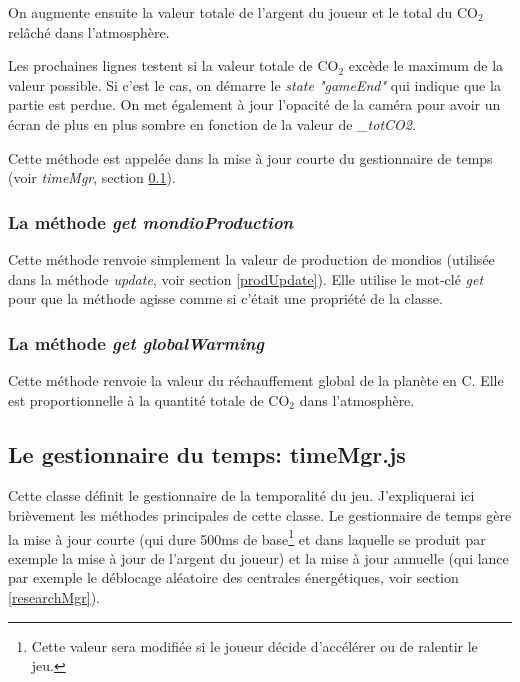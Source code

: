 \documentclass{article}
\begin{document}
		
		On augmente ensuite la valeur totale de l'argent du joueur et le total du CO$_{2}$ relâché dans l'atmosphère.
		
		
		Les prochaines lignes testent si la valeur totale de CO$_{2}$ excède le maximum de la valeur possible. Si c'est le cas, on démarre le \textit{state "gameEnd"} qui indique que la partie est perdue. On met également à jour l'opacité de la caméra pour avoir un écran de plus en plus sombre en fonction de la valeur de \textit{\_totCO2}.
		
		
		Cette méthode est appelée dans la mise à jour courte du gestionnaire de temps (voir \textit{timeMgr}, section \ref{timeMgr}).
		
		\subsubsection{La méthode \textit{get mondioProduction}} \label{mondioProduction}
		Cette méthode renvoie simplement la valeur de production de mondios (utilisée dans la méthode \textit{update}, voir section \ref{prodUpdate}). Elle utilise le mot-clé \textit{get} pour que la méthode agisse comme si c'était une propriété de la classe.
		
		\subsubsection{La méthode \textit{get globalWarming}} \label{globalWarming}
		Cette méthode renvoie la valeur du réchauffement global de la planète en \degree C. Elle est proportionnelle à la quantité totale de CO$_{2}$ dans l'atmosphère.
		
		\subsection{Le gestionnaire du temps: timeMgr.js} \label{timeMgr}
		
		
		Cette classe définit le gestionnaire de la temporalité du jeu. J'expliquerai ici brièvement les méthodes principales de cette classe. Le gestionnaire de temps gère la mise à jour courte (qui dure 500ms de base\footnote{Cette valeur sera modifiée si le joueur décide d'accélérer ou de ralentir le jeu.} et dans laquelle se produit par exemple la mise à jour de l'argent du joueur) et la mise à jour annuelle (qui lance par exemple le déblocage aléatoire des centrales énergétiques, voir section \ref{researchMgr}).
		
\end{document}
